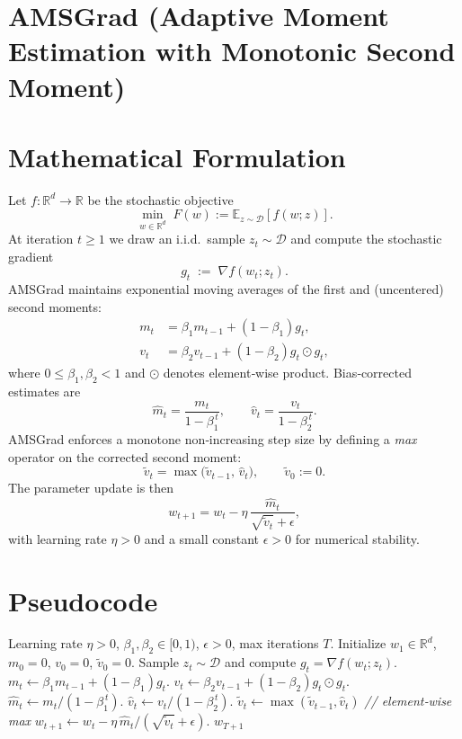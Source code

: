 \documentclass{article}
\newcommand{\E}{\mathbb{E}}
\newcommand{\R}{\mathbb{R}}
\begin{document}
\section*{AMSGrad (Adaptive Moment Estimation with Monotonic Second Moment)}

\section*{Mathematical Formulation}
Let $f:\R^{d}\rightarrow\R$ be the stochastic objective
\[
\min_{w\in\R^{d}} \; F(w) := \E_{z\sim\mathcal{D}}[f(w;z)] .
\]
At iteration $t\ge 1$ we draw an i.i.d.\ sample $z_t\sim\mathcal{D}$ and compute the stochastic gradient
\[
g_t \;:=\; \nabla f(w_t;z_t).
\]
AMSGrad maintains exponential moving averages of the first and (uncentered) second moments:
\[
\begin{aligned}
m_t &= \beta_1 m_{t-1} + (1-\beta_1) g_t, \tag{1}\\
v_t &= \beta_2 v_{t-1} + (1-\beta_2) g_t\odot g_t, \tag{2}
\end{aligned}
\]
where $0\le\beta_1,\beta_2<1$ and $\odot$ denotes element‑wise product.  
Bias‑corrected estimates are
\[
\hat m_t = \frac{m_t}{1-\beta_1^{\,t}},\qquad
\hat v_t = \frac{v_t}{1-\beta_2^{\,t}}. \tag{3}
\]
AMSGrad enforces a monotone non‑increasing step size by defining a \emph{max} operator on the corrected second moment:
\[
\tilde v_t = \max\bigl(\tilde v_{t-1},\,\hat v_t\bigr),\qquad \tilde v_0 := 0. \tag{4}
\]
The parameter update is then
\[
w_{t+1}= w_t - \eta \, \frac{\hat m_t}{\sqrt{\tilde v_t}+\epsilon}, \tag{5}
\]
with learning rate $\eta>0$ and a small constant $\epsilon>0$ for numerical stability.

\section*{Pseudocode}
\begin{algorithm}[H]
\caption{AMSGrad}
\begin{algorithmic}[1]
\Require Learning rate $\eta>0$, $\beta_1,\beta_2\in[0,1)$, $\epsilon>0$, max iterations $T$.
\State Initialize $w_1\in\R^{d}$, $m_0=0$, $v_0=0$, $\tilde v_0=0$.
    \State Sample $z_t\sim\mathcal{D}$ and compute $g_t=\nabla f(w_t;z_t)$.
    \State $m_t \gets \beta_1 m_{t-1} + (1-\beta_1) g_t$.
    \State $v_t \gets \beta_2 v_{t-1} + (1-\beta_2) g_t\odot g_t$.
    \State $\hat m_t \gets m_t/(1-\beta_1^{\,t})$.
    \State $\hat v_t \gets v_t/(1-\beta_2^{\,t})$.
    \State $\tilde v_t \gets \max(\tilde v_{t-1},\hat v_t)$ \hfill\textit{// element‑wise max}
    \State $w_{t+1} \gets w_t - \eta\,\hat m_t/(\sqrt{\tilde v_t}+\epsilon)$.
\EndFor
\State \Return $w_{T+1}$
\end{algorithmic}
\end{algorithm}
\end{document}
